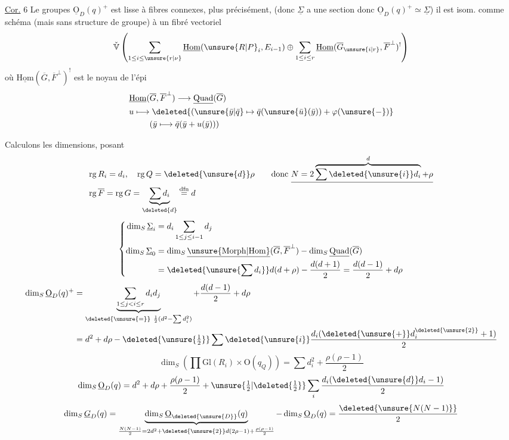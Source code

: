\uline{Cor.} 6 Le  groupes $\underline{\mathrm O}_D(q)^+$ est lisse à fibres connexes, plus précisément,   (donc $\underline\Sigma$ a une section donc $\underline{\mathrm O}_D(q)^+\simeq\underline\Sigma$) il est isom. comme schéma (mais sans structure de groupe) à un fibré  vectoriel
\[
\check{\mathbb V}\left(\sum_{1\leq i\leq\unsure{r|\nu}}\underline{\mathrm{Hom}}(\unsure{R|P}_i,E_{i-1})\oplus\sum_{1\leq i\leq r}\underline{\mathrm{Hom}}(\overline G_{\unsure{i|r}},\overline F^\perp)^{!}\right)
\]
où $\underline{\mathrm{Hom}}(\overline G,\overline F^\perp)^{!}$ est le noyau de l'épi
\[
\begin{aligned}
&\underline{\mathrm{Hom}}(\overline G,\overline F^\perp)\longrightarrow\underline{\mathrm{Quad}}(\overline G)\\
&u\longmapsto\deleted{(\unsure{\bar y|\bar q}\mapsto\bar q(\unsure{\bar u}(\bar y))+\varphi(\unsure{-})}\\
&\hphantom{u\longmapsto}(\bar y\longmapsto\bar q(\bar y+u(\bar y)))
\end{aligned}
\]

Calculons les dimensions, posant 
\[
\begin{aligned}
&\mathrm{rg}\,R_i=d_i,\quad \mathrm{rg}\,Q=\deleted{\unsure{d}}\rho
\qquad\text{donc }\underline{N=2\overbrace{\sum\deleted{\unsure{i}}d_i}^{d}+\rho}\\
&\mathrm{rg}\,\overline F=\mathrm{rg}\,G=\underbrace{\sum d_i}_{\deleted{d}}\overset{\mathrm{dfn}}{=}d
\end{aligned}
\]
\[
\left\{\begin{aligned}
\dim_S\underline\Sigma_i&=d_i\sum_{1\leq j\leq i-1}d_j\\
\dim_S\underline\Sigma_0&=\dim_S\underline{\unsure{\mathrm{Morph}|\mathrm{Hom}}}(\overline G,\overline F^\perp)-\dim_S\underline{\mathrm{Quad}}(\overline G)\\
&=\deleted{\unsure{\sum d_i}}d(d+\rho)-\frac{d(d+1)}{2}=\frac{d(d-1)}{2}+d\rho
\end{aligned}\right.
\]
\[
\begin{aligned}
\dim_S\underline{\mathrm O}_D(q)^+
 &=\underbrace{\sum_{1\leq j<i\leq r}d_i d_j}_{\deleted{\unsure{=}}\ \frac12(d^2-\sum d_i^2)}+\frac{d(d-1)}2+d\rho\\
 &=d^2+d\rho-\deleted{\unsure{\tfrac12}}\sum\deleted{\unsure{i}}\frac{d_i(\deleted{\unsure{+}}d_i^{\deleted{\unsure{2}}}+1)}2
\end{aligned}
\]
\[
\dim_S\left(\prod\mathrm{Gl}(R_i)\mathbin{\times}\mathrm O(q_Q)\right)=\sum d_i^2+\frac{\rho(\rho-1)}2
\]
\[
\dim_S\underline{\mathrm O}_D(q)=d^2+d\rho+\frac{\rho(\rho-1)}2+\unsure{\tfrac12|\deleted{\tfrac12}}\sum_i\frac{d_i(\deleted{\unsure{d}}d_i-1)}2
\]
\[
\dim_S\underline G_D(q)=
\underbrace{\dim_S\underline{\mathrm O}_{\deleted{\unsure{D}}}(q)}_{\frac{N(N-1)}2=2d^2+\deleted{\unsure{2}}d(2\rho-1)+\frac{\rho(\rho-1)}2}
-\dim_S\underline{\mathrm O}_D(q)=\frac{\deleted{\unsure{N(N-1)}}}{2}
\]
